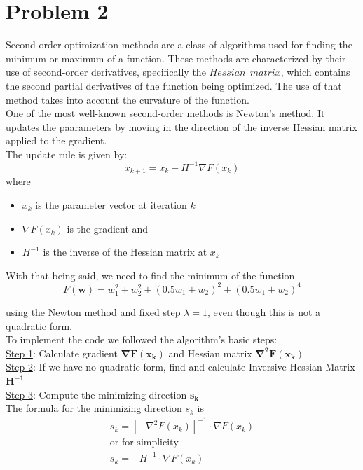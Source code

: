 \section{Problem 2}
Second-order optimization methods are a class of algorithms used for finding the minimum or maximum of a function. These methods are characterized by their use of second-order derivatives, specifically the $Hessian \ \ matrix$, which contains the second partial derivatives of the function being optimized. The use of that method takes into account the curvature of the function.\\

One of the most well-known second-order methods is Newton's method. It updates the paarameters by moving in the direction of the inverse Hessian matrix applied to the gradient.\\

The update rule is given by:
\begin{equation}
	x_{k+1} = x_k - H^{-1}\nabla F(x_k)
\end{equation}
where
\begin{itemize}
	\item $x_k$ is the parameter vector at iteration $k$
	\item $\nabla F(x_k)$ is the gradient and
	\item $ H^{-1}$ is the inverse of the Hessian matrix at $x_k$
\end{itemize}
\vspace{2mm}
With that being said, we need to find the minimum of the function
\begin{equation}	
	F(\mathbf{w})=w_{1}^{2}+w_{2}^{2}+(0.5w_{1}+w_{2})^{2}+(0.5w_{1}+w_{2})^{4}	
	\label{eq:Equation2}
\end{equation}


using the Newton method and fixed step $\lambda = 1$, even though this is not a quadratic form.\\

To implement the code we followed the algorithm's basic steps:\\

\underline{Step 1}: Calculate gradient $\mathbf{\nabla F(x_k)}$ and Hessian matrix $\mathbf{\nabla^2F(x_k)}$ \\

\underline{Step 2}: If we have no-quadratic form, find and calculate Inversive Hessian Matrix $\mathbf{H^{-1}}$\\

\underline{Step 3}: Compute the minimizing direction $\mathbf{s_{k}}$\\
The formula for the minimizing direction $s_{k}$ is
\begin{equation}
	\begin{gathered}
		s_{k} = \left[-\nabla^2F(x_k)\right]^{-1} \cdot \nabla F(x_k)\\
		\text{or for simplicity}\\
		s_{k} = -H^{-1} \cdot \nabla F(x_k)
	\end{gathered}
\end{equation}


